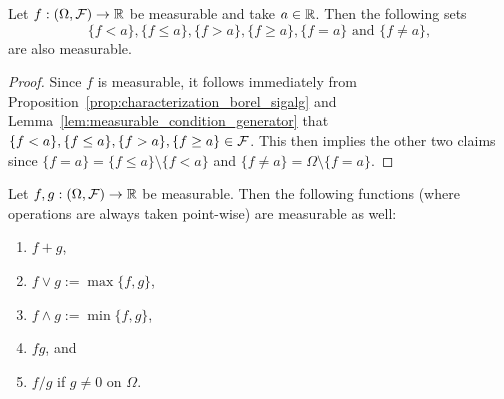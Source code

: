 \begin{lemma}\label{lem:measurable_set_real_line}
Let $f : (\Omega, \mathcal F) \to \mathbb R$ be measurable and take $a \in \mathbb R$. Then the following sets 
\[
	\{f < a\}, \{f \le a\}, \{f > a\}, \{f \ge a\}, \{f = a\} \text{ and } \{f \ne a\},
\]
are also measurable.
\end{lemma}

\begin{proof}
Since $f$ is measurable, it follows immediately from Proposition~\ref{prop:characterization_borel_sigalg} and Lemma~\ref{lem:measurable_condition_generator} that $\{f < a\}, \{f \le a\},\{f > a\}, \{f \ge a\} \in \mathcal F$. This then implies the other two claims since $\{f = a\} = \{f \le a\} \setminus \{f < a\}$ and $\{f \ne a\} = \Omega \setminus \{f = a\}$.
\end{proof}

\begin{lemma}
Let $f, g : (\Omega, \mathcal F) \to \mathbb R$ be measurable. Then the following functions (where operations are always taken point-wise) are measurable as well:
\begin{enumerate}
\item $f + g$,
\item $f \vee g := \max\{f,g\}$,
\item $f \wedge g := \min\{f,g\}$,
\item $f g$, and
\item $f/g$ if $g \ne 0$ on $\Omega$.
\end{enumerate} 
\end{lemma}

